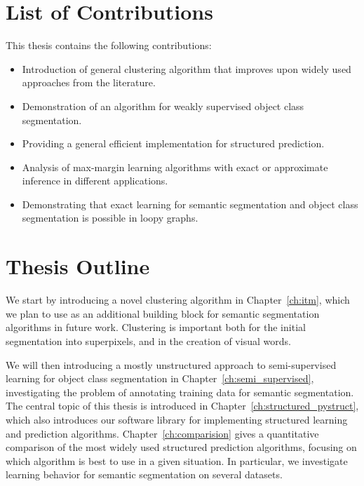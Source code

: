 
%
%

\section{List of Contributions}
This thesis contains the following contributions:
\begin{itemize}
\item Introduction of general clustering algorithm that improves upon widely used
    approaches from the literature.
\item Demonstration of an algorithm for  weakly supervised object class segmentation.
\item Providing a general efficient implementation for structured prediction.
\item Analysis of max-margin learning algorithms with exact or approximate inference in different applications.
\item Demonstrating that exact learning for semantic segmentation and object class segmentation is possible in loopy graphs.
\end{itemize}

\section{Thesis Outline}
We start by introducing a novel clustering algorithm in Chapter~\ref{ch:itm},
which we plan to use as an additional building block for semantic segmentation
algorithms in future work. Clustering is important both for the initial
segmentation into superpixels, and in the creation of visual words.

We will then introducing a mostly unstructured
approach to semi-supervised learning for object class segmentation in
Chapter~\ref{ch:semi_supervised}, investigating the problem of annotating
training data for semantic segmentation. The central topic of this thesis is
introduced in Chapter~\ref{ch:structured_pystruct}, which also introduces our
software library for implementing structured learning and prediction
algorithms.
Chapter~\ref{ch:comparision} gives a quantitative comparison of the most widely
used structured prediction algorithms, focusing on which algorithm is best to
use in a given situation. In particular, we investigate learning behavior for
semantic segmentation on several datasets.

